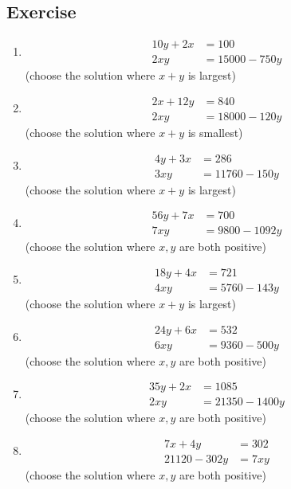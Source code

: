 \documentclass[a4paper,11pt]{article}
\begin{document}
\subsection{Exercise}\label{ex6}
\begin{multicols}{2}
\begin{enumerate}
\item\begin{align*}
10y+2x&=100\\
2xy&=15000-750y 
\end{align*}\footnotesize(choose the solution where $x+y$ is largest)\normalsize\\
\item\begin{align*}
2x+12y&=840\\
2xy&=18000-120y
\end{align*}\footnotesize(choose the solution where $x+y$ is smallest) \normalsize
\item\begin{align*}
4y+3x&=286\\
3xy&=11760-150y
\end{align*}\footnotesize (choose the solution where $x+y$ is largest) \normalsize
\item\begin{align*}
56y+7x&=700\\
7xy&=9800-1092y
\end{align*}\footnotesize(choose the solution where $x,y$ are both positive) \normalsize
\item\begin{align*}
18y+4x&=721\\
4xy&=5760-143y
\end{align*}\footnotesize (choose the solution where $x+y$ is largest) \normalsize
\item\begin{align*}
24y+6x&=532\\
6xy&=9360-500y
\end{align*}\footnotesize (choose the solution where $x,y$ are both positive)\normalsize
\item\begin{align*}
35y+2x&=1085\\
2xy&=21350-1400y
\end{align*}\footnotesize (choose the solution where $x,y$ are both positive) \normalsize
\item\begin{align*}
7x+4y&=302\\
21120-302y&=7xy
\end{align*}\footnotesize (choose the solution where $x,y$ are both positive)\normalsize
\end{enumerate}
\end{multicols}
\end{document}
